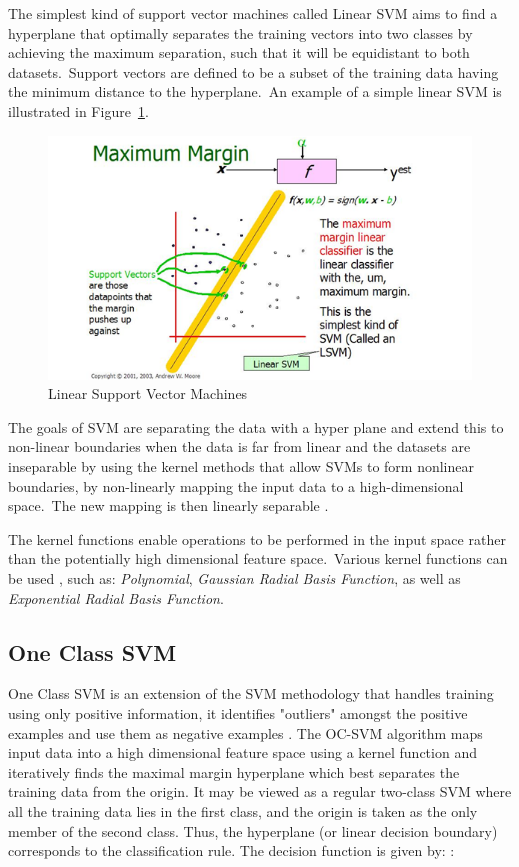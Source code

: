 			The simplest kind of support vector machines called Linear SVM aims to find a hyperplane that optimally separates the training vectors into two classes by achieving the maximum separation, such that it will be equidistant to both datasets.\ Support vectors are defined to be a subset of the training data having the minimum distance to the hyperplane.\ An example of a simple linear SVM is illustrated in Figure~\ref{svm}.
				
				\begin{figure}[h!]
					\centering
					\includegraphics[scale=0.7]{figures/LSVM.PNG} 
					\caption{Linear Support Vector Machines \cite{SvmSlides}} \label{svm} 
				\end{figure}

			The goals of SVM are separating the data with a hyper plane and extend this to non-linear boundaries when the data is far from linear and the datasets are inseparable by using the kernel methods that allow SVMs to form nonlinear boundaries, by non-linearly mapping the input data to a high-dimensional space.\ The new mapping is then linearly separable \cite{Nello:Svm} \cite{Tom:MachineLearning}.

			The kernel functions enable operations to be performed in the input space rather than the potentially high dimensional feature space.\ Various kernel functions can be used \cite{Nello:Svm}, such as: \textit{Polynomial}, \textit{Gaussian Radial Basis Function}, as well as \textit{Exponential Radial Basis Function}.

			\subsection{One Class SVM}
		
			One Class SVM is an extension of the SVM methodology that handles training using only positive information, it identifies "outliers" amongst the positive examples and use them as negative examples \cite{Larry:OCSVM}. The OC-SVM algorithm maps input data into a high dimensional feature space using a kernel function and iteratively finds the maximal margin hyperplane which best separates the training data from the origin. It may be viewed as a regular two-class SVM where all the training data lies in the first class, and the origin is taken as the only member of the second class. Thus, the hyperplane (or linear decision boundary) corresponds to the classification rule. The decision function is given by:  \cite{Katherine:OCSVM}:

